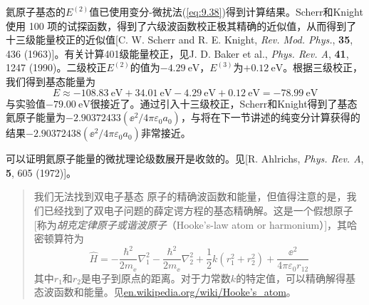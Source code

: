     氦原子基态的$E^{\left(2\right)}$值已使用变分-微扰法(\ref{eq:9.38})得到计算结果。Scherr和Knight使用 100 项的试探函数，得到了六级波函数校正极其精确的近似值，从而得到了十三级能量校正的近似值[C. W. Scherr and R. E. Knight, \textit{Rev. Mod. Phys.}, \textbf{35}, 436 (1963)]。有关计算401级能量校正，见J. D. Baker et al., \textit{Phys. Rev. A}, \textbf{41}, 1247 (1990)。二级校正$E^{\left(2\right)}$的值为$-4.29 \: \mathrm{eV}$，$E^{\left(3\right)}$为$+0.12 \: \mathrm{eV}$。根据三级校正，我们得到基态能量为
    \begin{equation*}
        E \approx -108.83 \: \mathrm{eV} + 34.01 \: \mathrm{eV} - 4.29 \: \mathrm{eV} + 0.12 \: \mathrm{eV} = -78.99 \: \mathrm{eV}
    \end{equation*}
    与实验值$-79.00 \: \mathrm{eV}$很接近了。通过引入十三级校正，Scherr和Knight得到了基态氦原子能量为$-2.90372433 \left(\ee ^2 / 4\pi\varepsilon_0a_0\right)$，与将在下一节讲述的纯变分计算获得的结果$-2.90372438 \left(\ee ^2 / 4\pi\varepsilon_0a_0\right)$非常接近。

    可以证明氦原子能量的微扰理论级数展开是收敛的。见[R. Ahlrichs, \textit{Phys. Rev. A}, \textbf{5}, 605 (1972)]。

    \begin{quote}
        \small
        \noindent 我们无法找到双电子基态  原子的精确波函数和能量，但值得注意的是，我们已经找到了双电子问题的薛定谔方程的基态精确解。这是一个假想原子[称为\textit{胡克定律原子或谐波原子}（Hooke's-law atom or harmonium）]，其哈密顿算符为
        \begin{equation*}
            \hat{H} = -\frac{\hbar^2}{2m_{\ee }}\nabla_1^2 - \frac{\hbar^2}{2m_{\ee }}\nabla_2^2 + \frac{1}{2}k\left(r_1^2 + r_2^2\right) + \frac{\ee ^2}{4\pi\varepsilon_0r_{12}}
        \end{equation*}
        其中$r_1$和$r_2$是电子到原点的距离。对于力常数$k$的特定值，可以精确解得基态波函数和能量。见\url{en.wikipedia.org/wiki/Hooke’s_atom}。
    \end{quote}

